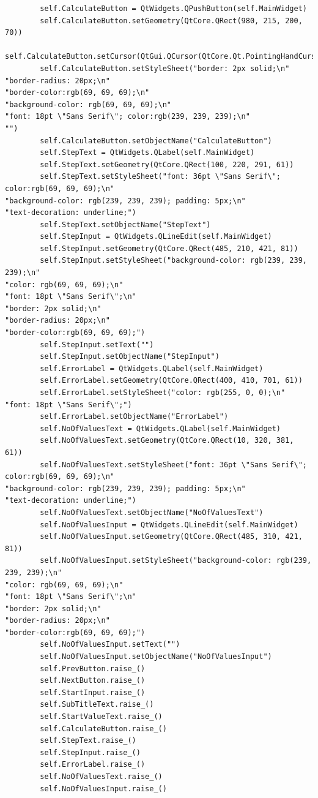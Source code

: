\documentclass{article}
\begin{document}
\begin{lstlisting}
        self.CalculateButton = QtWidgets.QPushButton(self.MainWidget)
        self.CalculateButton.setGeometry(QtCore.QRect(980, 215, 200, 70))
        self.CalculateButton.setCursor(QtGui.QCursor(QtCore.Qt.PointingHandCursor))
        self.CalculateButton.setStyleSheet("border: 2px solid;\n"
"border-radius: 20px;\n"
"border-color:rgb(69, 69, 69);\n"
"background-color: rgb(69, 69, 69);\n"
"font: 18pt \"Sans Serif\"; color:rgb(239, 239, 239);\n"
"")
        self.CalculateButton.setObjectName("CalculateButton")
        self.StepText = QtWidgets.QLabel(self.MainWidget)
        self.StepText.setGeometry(QtCore.QRect(100, 220, 291, 61))
        self.StepText.setStyleSheet("font: 36pt \"Sans Serif\"; color:rgb(69, 69, 69);\n"
"background-color: rgb(239, 239, 239); padding: 5px;\n"
"text-decoration: underline;")
        self.StepText.setObjectName("StepText")
        self.StepInput = QtWidgets.QLineEdit(self.MainWidget)
        self.StepInput.setGeometry(QtCore.QRect(485, 210, 421, 81))
        self.StepInput.setStyleSheet("background-color: rgb(239, 239, 239);\n"
"color: rgb(69, 69, 69);\n"
"font: 18pt \"Sans Serif\";\n"
"border: 2px solid;\n"
"border-radius: 20px;\n"
"border-color:rgb(69, 69, 69);")
        self.StepInput.setText("")
        self.StepInput.setObjectName("StepInput")
        self.ErrorLabel = QtWidgets.QLabel(self.MainWidget)
        self.ErrorLabel.setGeometry(QtCore.QRect(400, 410, 701, 61))
        self.ErrorLabel.setStyleSheet("color: rgb(255, 0, 0);\n"
"font: 18pt \"Sans Serif\";")
        self.ErrorLabel.setObjectName("ErrorLabel")
        self.NoOfValuesText = QtWidgets.QLabel(self.MainWidget)
        self.NoOfValuesText.setGeometry(QtCore.QRect(10, 320, 381, 61))
        self.NoOfValuesText.setStyleSheet("font: 36pt \"Sans Serif\"; color:rgb(69, 69, 69);\n"
"background-color: rgb(239, 239, 239); padding: 5px;\n"
"text-decoration: underline;")
        self.NoOfValuesText.setObjectName("NoOfValuesText")
        self.NoOfValuesInput = QtWidgets.QLineEdit(self.MainWidget)
        self.NoOfValuesInput.setGeometry(QtCore.QRect(485, 310, 421, 81))
        self.NoOfValuesInput.setStyleSheet("background-color: rgb(239, 239, 239);\n"
"color: rgb(69, 69, 69);\n"
"font: 18pt \"Sans Serif\";\n"
"border: 2px solid;\n"
"border-radius: 20px;\n"
"border-color:rgb(69, 69, 69);")
        self.NoOfValuesInput.setText("")
        self.NoOfValuesInput.setObjectName("NoOfValuesInput")
        self.PrevButton.raise_()
        self.NextButton.raise_()
        self.StartInput.raise_()
        self.SubTitleText.raise_()
        self.StartValueText.raise_()
        self.CalculateButton.raise_()
        self.StepText.raise_()
        self.StepInput.raise_()
        self.ErrorLabel.raise_()
        self.NoOfValuesText.raise_()
        self.NoOfValuesInput.raise_()


\end{lstlisting}
\end{document}
